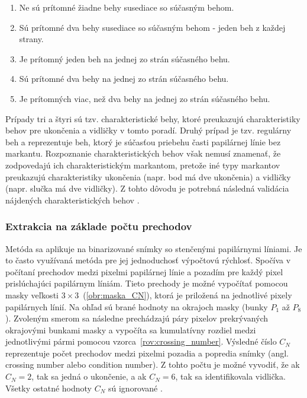   \begin{enumerate}
    \item Ne sú prítomné žiadne behy susediace so súčasným behom.
    \item Sú prítomné dva behy susediace so súčasným behom - jeden beh z každej strany.
    \item Je prítomný jeden beh na jednej zo strán súčasného behu.
    \item Sú prítomné dva behy na jednej zo strán súčasného behu.
    \item Je prítomných viac, než dva behy na jednej zo strán súčasného behu.
  \end{enumerate}
  Prípady tri a štyri sú tzv. charakteristické behy, ktoré preukazujú charakteristiky behov pre ukončenia a vidličky v tomto poradí. Druhý prípad je
  tzv. regulárny beh a reprezentuje beh, ktorý je súčasťou priebehu časti papilárnej línie bez markantu. Rozpoznanie charakteristických behov však
  nemusí znamenať, že zodpovedajú ich charakteristickým markantom, pretože iné typy markantov preukazujú charakteristiky ukončenia (napr. bod má dve ukončenia)
  a vidličky (napr. slučka má dve vidličky). Z tohto dôvodu je potrebná následná validácia nájdených charakteristických behov \cite{bansal2011minutiae}.

  \subsubsection*{Extrakcia na základe počtu prechodov}
  Metóda sa aplikuje na binarizované snímky so stenčenými papilárnymi líniami. Je to často využívaná metóda pre jej jednoduchosť výpočtovú rýchlosť.
  Spočíva v počítaní prechodov medzi pixelmi papilárnej línie a pozadím pre každý pixel prislúchajúci papilárnym líniám. Tieto prechody je možné vypočítať
  pomocou masky veľkosti {$3\times{}3$}~(\ref{obr:maska_CN}), ktorá je priložená na jednotlivé pixely papilárnych línií. Na ohľad sú brané
  hodnoty na okrajoch masky (bunky $P_1$ až $P_8$). Zvoleným smerom sa následne prechádzajú páry pixelov prekrývaných okrajovými bunkami masky a vypočíta
  sa kumulatívny rozdiel medzi jednotlivými pármi pomocou vzorca~{\ref{rov:crossing_number}}. Výsledné číslo $C_N$ reprezentuje počet prechodov medzi
  pixelmi pozadia a popredia snímky (angl. crossing number alebo condition number). Z tohto počtu je možné vyvodiť, že ak $C_N = 2$, tak sa jedná o ukončenie,
  a ak $C_N = 6$, tak sa identifikovala vidlička. Všetky ostatné hodnoty $C_N$ sú ignorované \cite{amengual1997minutiae_extraction}.

